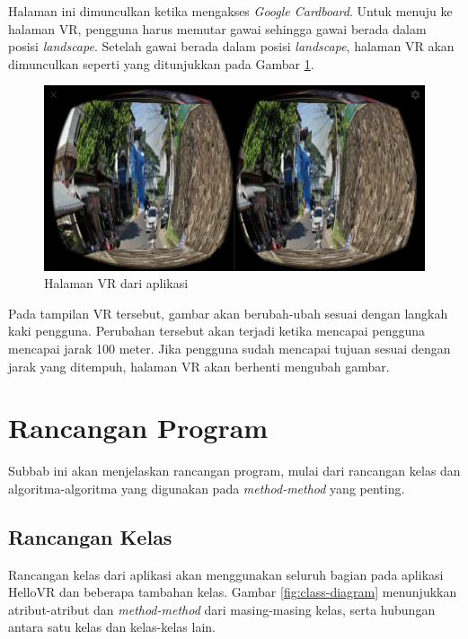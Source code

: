 Halaman ini dimunculkan ketika mengakses \textit{Google Cardboard}. Untuk menuju ke halaman VR, pengguna harus memutar gawai sehingga gawai berada dalam posisi \textit{landscape}. Setelah gawai berada dalam posisi \textit{landscape}, halaman VR akan dimunculkan seperti yang ditunjukkan pada Gambar \ref{fig:vr-page}.

\begin{figure}[h]
	\centering
		\includegraphics[scale=0.4]{Gambar/vr-page.png}
	\caption{Halaman VR dari aplikasi}
	\label{fig:vr-page}
\end{figure}

Pada tampilan VR tersebut, gambar akan berubah-ubah sesuai dengan langkah kaki pengguna. Perubahan tersebut akan terjadi ketika mencapai pengguna mencapai jarak 100 meter. Jika pengguna sudah mencapai tujuan sesuai dengan jarak yang ditempuh, halaman VR akan berhenti mengubah gambar.     

\section{Rancangan Program}
Subbab ini akan menjelaskan rancangan  program, mulai dari rancangan kelas dan algoritma-algoritma yang digunakan pada \textit{method-method} yang penting. 

\subsection{Rancangan Kelas}
Rancangan kelas dari aplikasi akan menggunakan seluruh bagian pada aplikasi HelloVR dan beberapa tambahan kelas. Gambar \ref{fig:class-diagram} menunjukkan atribut-atribut dan \textit{method-method} dari masing-masing kelas, serta hubungan antara satu kelas dan kelas-kelas lain. 

